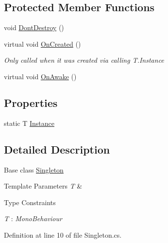 \subsection*{Protected Member Functions}
\begin{DoxyCompactItemize}
\item 
void \mbox{\hyperlink{class_singleton_a45ddae0b74be7efd7a92f3c2941fa4c0}{Dont\+Destroy}} ()
\item 
virtual void \mbox{\hyperlink{class_singleton_a2fe04de8c37c320855283a1a1274ea26}{On\+Created}} ()
\begin{DoxyCompactList}\small\item\em Only called when it was created via calling T.\+Instance \end{DoxyCompactList}\item 
virtual void \mbox{\hyperlink{class_singleton_aac558b29781a363c0845b0359c8f85ff}{On\+Awake}} ()
\end{DoxyCompactItemize}
\subsection*{Properties}
\begin{DoxyCompactItemize}
\item 
static T \mbox{\hyperlink{class_singleton_a54103e8475b2a352ee759d5732307534}{Instance}}
\end{DoxyCompactItemize}


\subsection{Detailed Description}
Base class \mbox{\hyperlink{class_singleton}{Singleton}} 


\begin{DoxyTemplParams}{Template Parameters}
{\em T} & \\
\hline
\end{DoxyTemplParams}
\begin{Desc}
\item[Type Constraints]\begin{description}
\item[{\em T} : {\em Mono\+Behaviour}]\end{description}
\end{Desc}


Definition at line 10 of file Singleton.\+cs.



